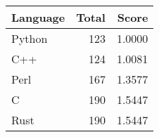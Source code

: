 \centering
\begin{tabular}{|l|r|r|}
    \hline
    Language & Total & Score \\
    \hline
    Python & 123 & 1.0000 \\
    C++ & 124 & 1.0081 \\
    Perl & 167 & 1.3577 \\
    C & 190 & 1.5447 \\
    Rust & 190 & 1.5447 \\
    \hline
\end{tabular}
